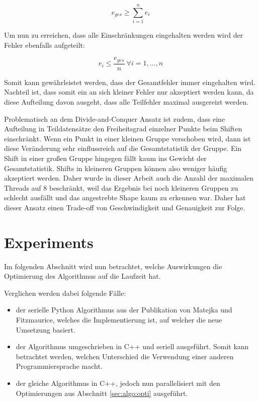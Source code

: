 \documentclass[sigconf]{acmart}
\begin{document}
$$
e_{ges} \geq \sum_{i=1}^{n} e_i
$$

Um nun zu erreichen, dass alle Einschränkungen eingehalten werden wird der Fehler ebenfalls aufgeteilt:

$$
e_i \leq \frac{e_{ges}}{n} ~ \forall i = 1, \dots, n
$$

Somit kann gewährleistet werden, dass der Gesamtfehler immer eingehalten wird. Nachteil ist, dass somit ein an sich kleiner Fehler nur akzeptiert werden kann, da diese Aufteilung davon ausgeht, dass alle Teilfehler maximal ausgereizt werden. 

Problematisch an dem Divide-and-Conquer Ansatz ist zudem, dass eine Aufteilung in Teildatensätze den Freiheitsgrad einzelner Punkte beim Shiften einschränkt. Wenn ein Punkt in einer kleinen Gruppe verschoben wird, dann ist diese Veränderung sehr einflussreich auf die Gesamtstatistik der Gruppe. Ein Shift in einer großen Gruppe hingegen fällt kaum ins Gewicht der Gesamtstatistik. Shifts in kleineren Gruppen können also weniger häufig akzeptiert werden. Daher wurde in dieser Arbeit auch die Anzahl der maximalen Threads auf 8 beschränkt, weil das Ergebnis bei noch kleineren Gruppen zu schlecht ausfällt und das angestrebte Shape kaum zu erkennen war. Daher hat dieser Ansatz einen Trade-off von Geschwindigkeit und Genauigkeit zur Folge. 



\section{Experiments}\label{sec:exp}

Im folgenden Abschnitt wird nun betrachtet, welche Auswirkungen die Optimierung des Algorithmus auf die Laufzeit hat. 

Verglichen werden dabei folgende Fälle:

\begin{itemize}
  \item der serielle Python Algorithmus aus der Publikation von Matejka und Fitzmaurice\cite{matejka2017same}, welches die Implementierung ist, auf welcher die neue Umsetzung basiert. 
  \item der Algorithmus umgeschrieben in C++ und seriell ausgeführt. Somit kann betrachtet werden, welchen Unterschied die Verwendung einer anderen Programmiersprache macht.
  \item der gleiche Algorithmus in C++, jedoch nun parallelisiert mit den Optimierungen aus Abschnitt \ref{sec:algo:opti} ausgeführt.
\end{itemize}
\end{document}
